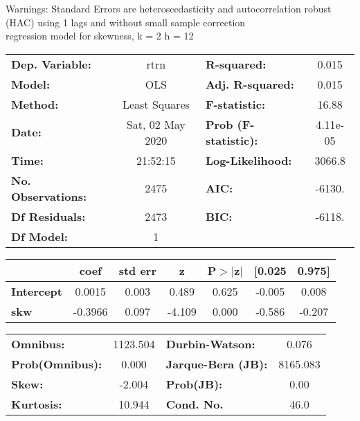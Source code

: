 Warnings: \newline
 [1] Standard Errors are heteroscedasticity and autocorrelation robust (HAC) using 1 lags and without small sample correction\\ 

regression model for skewness, k = 2 h = 12\begin{center}
\begin{tabular}{lclc}
\toprule
\textbf{Dep. Variable:}    &       rtrn       & \textbf{  R-squared:         } &     0.015   \\
\textbf{Model:}            &       OLS        & \textbf{  Adj. R-squared:    } &     0.015   \\
\textbf{Method:}           &  Least Squares   & \textbf{  F-statistic:       } &     16.88   \\
\textbf{Date:}             & Sat, 02 May 2020 & \textbf{  Prob (F-statistic):} &  4.11e-05   \\
\textbf{Time:}             &     21:52:15     & \textbf{  Log-Likelihood:    } &    3066.8   \\
\textbf{No. Observations:} &        2475      & \textbf{  AIC:               } &    -6130.   \\
\textbf{Df Residuals:}     &        2473      & \textbf{  BIC:               } &    -6118.   \\
\textbf{Df Model:}         &           1      & \textbf{                     } &             \\
\bottomrule
\end{tabular}
\begin{tabular}{lcccccc}
                   & \textbf{coef} & \textbf{std err} & \textbf{z} & \textbf{P$> |$z$|$} & \textbf{[0.025} & \textbf{0.975]}  \\
\midrule
\textbf{Intercept} &       0.0015  &        0.003     &     0.489  &         0.625        &       -0.005    &        0.008     \\
\textbf{skw}       &      -0.3966  &        0.097     &    -4.109  &         0.000        &       -0.586    &       -0.207     \\
\bottomrule
\end{tabular}
\begin{tabular}{lclc}
\textbf{Omnibus:}       & 1123.504 & \textbf{  Durbin-Watson:     } &    0.076  \\
\textbf{Prob(Omnibus):} &   0.000  & \textbf{  Jarque-Bera (JB):  } & 8165.083  \\
\textbf{Skew:}          &  -2.004  & \textbf{  Prob(JB):          } &     0.00  \\
\textbf{Kurtosis:}      &  10.944  & \textbf{  Cond. No.          } &     46.0  \\
\bottomrule
\end{tabular}
\end{center}

